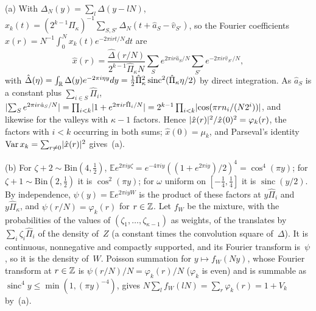 \begin{outline}
(a) With $\Delta_N(y)=\sum_l\Delta(y-lN)$, $x_k(t)=(2^{k-1}\hat\Pi_\kappa)^{-1}\sum_{S,S'}\Delta_N(t+\hat a_S-\hat v_{S'})$,
so the Fourier coefficients $\hat x(r)=N^{-1}\int_0^Nx_k(t)e^{-2\pi irt/N}dt$ are
\[
  \hat x(r)=\frac{\hat\Delta(r/N)}{2^{k-1}\hat\Pi_\kappa N}\sum_Se^{2\pi ir\hat a_S/N}\sum_{S'}e^{-2\pi ir\hat v_{S'}/N},
\]
with $\hat\Delta(\eta)=\int_{\mathbb{R}}\Delta(y)e^{-2\pi i\eta y}dy=\frac12\hat\Pi_\kappa^2\operatorname{sinc}^2(\hat\Pi_\kappa\eta/2)$
by direct integration. As $\hat a_S$ is a constant plus $\sum_{i\in S}\hat\Pi_i$,
$\lvert \sum_Se^{2\pi ir\hat a_S/N} \rvert=\prod_{i<k}\lvert 1+e^{2\pi ir\hat\Pi_i/N} \rvert=2^{k-1}\prod_{i<k}\lvert \cos(\pi rn_i/(N2^i)) \rvert$,
and likewise for the valleys with $\kappa-1$ factors. Hence $\lvert \hat x(r) \rvert^2/\hat x(0)^2=\varphi_k(r)$, the factors with
$i<k$ occurring in both sums; $\hat x(0)=\mu_k$, and
Parseval's identity $\operatorname{Var}x_k=\sum_{r\ne0}\lvert \hat x(r) \rvert^2$ gives~(a).

(b) For $\zeta+2\sim\mathrm{Bin}(4,\frac12)$,
$\mathbb Ee^{2\pi iy\zeta}=e^{-4\pi iy}((1+e^{2\pi iy})/2)^4=\cos^4(\pi y)$; for $\zeta+1\sim\mathrm{Bin}(2,\frac12)$ it is
$\cos^2(\pi y)$; for $\omega$ uniform on $[-\frac14,\frac14]$ it is $\operatorname{sinc}(y/2)$. By independence,
$\psi(y)=\mathbb Ee^{2\pi iyW}$ is the product of these factors at $y\hat\Pi_i$ and $y\hat\Pi_\kappa$, and
$\psi(r/N)=\varphi_k(r)$ for $r\in\mathbb{Z}$. Let $f_W$ be the mixture, with the probabilities of the values of
$(\zeta_1,\dots,\zeta_{\kappa-1})$ as weights, of the translates by $\sum_i\zeta_i\hat\Pi_i$ of the density of~$Z$ (a
constant times the convolution square of~$\Delta$). It is continuous, nonnegative and compactly supported, and its Fourier
transform is~$\psi$, so it is the density of~$W$. Poisson summation for $y\mapsto f_W(Ny)$, whose Fourier transform at
$r\in\mathbb{Z}$ is $\psi(r/N)/N=\varphi_k(r)/N$ ($\varphi_k$ is even) and is summable as
$\operatorname{sinc}^4y\le\min(1,(\pi y)^{-4})$, gives $N\sum_lf_W(lN)=\sum_r\varphi_k(r)=1+V_k$ by~(a).


\end{outline}
